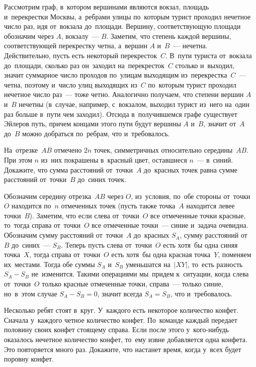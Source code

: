 \ifincludesolutions
Рассмотрим граф, в~котором вершинами являются вокзал, площадь
и~перекрестки Москвы, а~ребрами улицы по~которым турист проходил нечетное число
раз, идя от~вокзала до~площади.
Вершину, соответствующую площади обозначим через $A$, вокзалу~— $B$.
Заметим, что степень каждой вершины, соответствующей перекрестку четна,
а~вершин $A$ и~$B$~— нечетна.
Действительно, пусть есть некоторый перекресток~$C$.
В~пути туриста от~вокзала до~площади, сколько раз он~заходил на~перекресток~$C$
столько и~выходил, значит суммарное число проходов по~улицам выходящим
из~перекрестка~$C$~— четна, поэтому и~число улиц выходящих из~$C$ по~которым
турист проходил нечетное число раз~— тоже четно.
Аналогично получаем, что степени вершин $A$ и~$B$ нечетны (в~случае, например,
с~вокзалом, выходил турист из~него на~один раз больше в~пути чем заходил).
Отсюда в~получившемся графе существует Эйлеров путь, причем концами этого пути
будут вершины $A$ и~$B$, значит от~$A$ до~$B$ можно добраться по~ребрам, что
и~требовалось.
\fi %

\begin{problems}

\item
На~отрезке~$AB$ отмечено $2 n$ точек, симметричных относительно середины~$AB$.
При этом $n$ из~них покрашены в~красный цвет, оставшиеся $n$~— в~синий.
Докажите, что сумма расстояний от~точки~$A$ до~красных точек равна сумме
расстояний от~точки~$B$ до~синих точек.

\end{problems}

\ifincludesolutions
Обозначим середину отрезка~$AB$ через $O$, из~условия, по~обе
стороны от~точки~$O$ находится по~$n$ отмеченных точек (пусть также точка~$A$
находится левее точки~$B$).
Заметим, что если слева от~точки~$O$ все отмеченные точки красные, то~тогда
справа от~точки~$O$ все отмеченные точки~— синие и~задача очевидна.
Обозначим сумму расстояний от~точки~$A$ до~красных $S_A$, сумму расстояний
от~$B$ до~синих~— $S_B$.
Теперь пусть слева от~точки~$O$ есть хотя~бы одна синяя точка~$X$, тогда справа
от~точки~$O$ есть хотя~бы одна красная точка~$Y$, поменяем их~местами.
Тогда обе суммы $S_A$ и~$S_B$ уменьшатся на~$\lvert XY \rvert$, то~есть разность
$S_A - S_B$ не~изменится.
Такими операциями мы~придем к~ситуации, когда слева от~точки~$O$ только красные
отмеченные точки, справа~— только синие, но~в~этом случае $S_A - S_B = 0$,
значит всегда $S_A = S_B$, что и~требовалось.
\fi %

\begin{problems}

\item
Несколько ребят стоят в~круг.
У~каждого есть некоторое количество конфет.
Сначала у~каждого четное количество конфет.
По~команде каждый передает половину своих конфет стоящему справа.
Если после этого у~кого-нибудь оказалось нечетное количество конфет, то~ему
извне добавляется одна конфета.
Это повторяется много раз.
Докажите, что настанет время, когда у~всех будет поровну конфет.

\end{problems}

